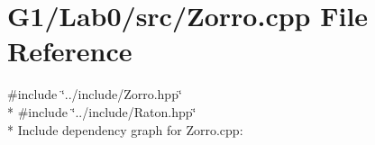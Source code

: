 \section{G1/\+Lab0/src/\+Zorro.cpp File Reference}
\label{_zorro_8cpp}
{\ttfamily \#include \char`\"{}../include/\+Zorro.\+hpp\char`\"{}}\\*
{\ttfamily \#include \char`\"{}../include/\+Raton.\+hpp\char`\"{}}\\*
Include dependency graph for Zorro.\+cpp\+:
